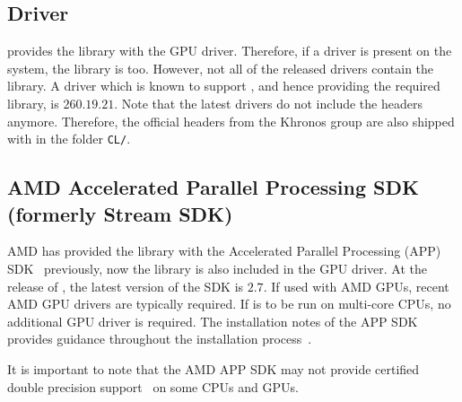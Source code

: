 
\subsection{\NVIDIA Driver}
\NVIDIA provides the {\OpenCL} library with the GPU driver. Therefore, if a
\NVIDIA driver is present on the system, the library is too. However,
not all of the released drivers contain the {\OpenCL} library.
A driver which is known to support {\OpenCL}, and hence providing the required
library, is $260.19.21$. Note that the latest {\NVIDIA} drivers do not include
the {\OpenCL} headers anymore. Therefore, the official {\OpenCL} headers from
the Khronos group \cite{khronoscl} are also shipped with {\ViennaCL} in the
folder \lstinline|CL/|.

\subsection{AMD Accelerated Parallel Processing SDK (formerly Stream SDK)} \label{sec:opencl-on-ati}
AMD has provided the {\OpenCL} library with the Accelerated Parallel Processing (APP)
SDK~\cite{atistream} previously, now the {\OpenCL} library is also included in the GPU driver.
At the release of {\ViennaCLversion}, the latest version of the
SDK is $2.7$. If used with AMD GPUs, recent AMD GPU drivers are typically required. If {\ViennaCL} is to be run on multi-core CPUs,
no additional GPU driver is required. The installation notes
of the APP SDK provides guidance throughout the
installation process~\cite{atistreamdocu}.


It is important to note that the AMD APP SDK may not provide {\OpenCL}
certified double precision support~\cite{atidouble} on some CPUs and GPUs.


